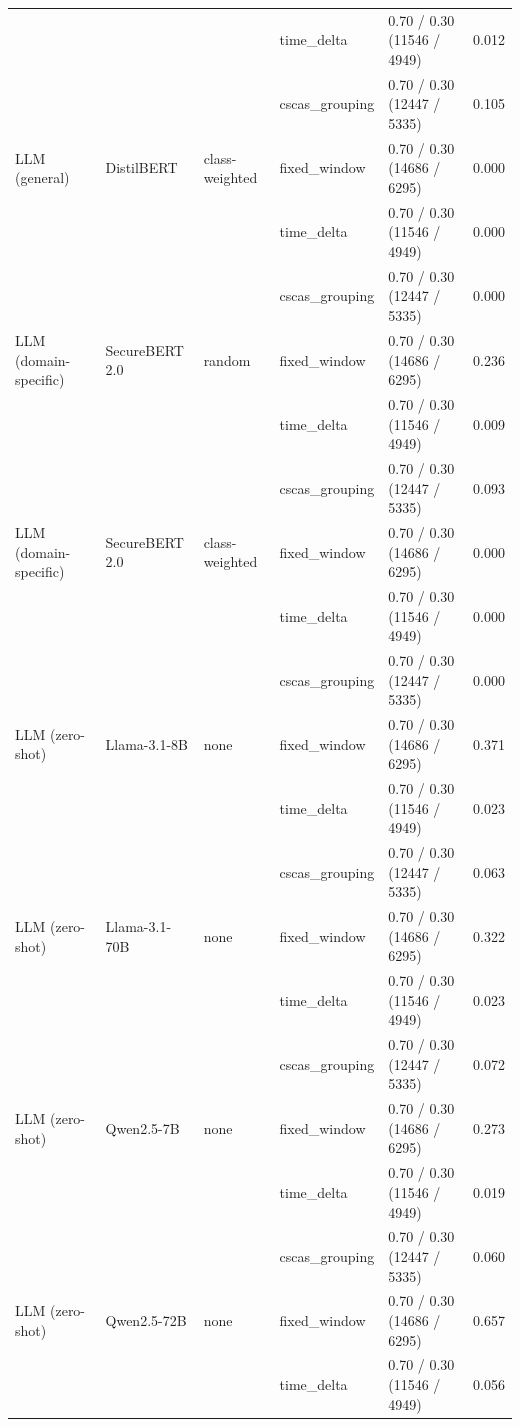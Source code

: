 \begin{table}[htbp]
{\begin{tabular}{lllllc}
 &  &  & time\_delta & 0.70 / 0.30 (11546 / 4949) & 0.012 \\
 &  &  & cscas\_grouping & 0.70 / 0.30 (12447 / 5335) & 0.105 \\
\addlinespace
LLM (general) & DistilBERT & class-weighted & fixed\_window & 0.70 / 0.30 (14686 / 6295) & 0.000 \\
 &  &  & time\_delta & 0.70 / 0.30 (11546 / 4949) & 0.000 \\
 &  &  & cscas\_grouping & 0.70 / 0.30 (12447 / 5335) & 0.000 \\
\addlinespace
LLM (domain-specific) & SecureBERT 2.0 & random & fixed\_window & 0.70 / 0.30 (14686 / 6295) & 0.236 \\
 &  &  & time\_delta & 0.70 / 0.30 (11546 / 4949) & 0.009 \\
 &  &  & cscas\_grouping & 0.70 / 0.30 (12447 / 5335) & 0.093 \\
\addlinespace
LLM (domain-specific) & SecureBERT 2.0 & class-weighted & fixed\_window & 0.70 / 0.30 (14686 / 6295) & 0.000 \\
 &  &  & time\_delta & 0.70 / 0.30 (11546 / 4949) & 0.000 \\
 &  &  & cscas\_grouping & 0.70 / 0.30 (12447 / 5335) & 0.000 \\
\addlinespace
LLM (zero-shot) & Llama-3.1-8B & none & fixed\_window & 0.70 / 0.30 (14686 / 6295) & 0.371 \\
 &  &  & time\_delta & 0.70 / 0.30 (11546 / 4949) & 0.023 \\
 &  &  & cscas\_grouping & 0.70 / 0.30 (12447 / 5335) & 0.063 \\
\addlinespace
LLM (zero-shot) & Llama-3.1-70B & none & fixed\_window & 0.70 / 0.30 (14686 / 6295) & 0.322 \\
 &  &  & time\_delta & 0.70 / 0.30 (11546 / 4949) & 0.023 \\
 &  &  & cscas\_grouping & 0.70 / 0.30 (12447 / 5335) & 0.072 \\
\addlinespace
LLM (zero-shot) & Qwen2.5-7B & none & fixed\_window & 0.70 / 0.30 (14686 / 6295) & 0.273 \\
 &  &  & time\_delta & 0.70 / 0.30 (11546 / 4949) & 0.019 \\
 &  &  & cscas\_grouping & 0.70 / 0.30 (12447 / 5335) & 0.060 \\
\addlinespace
LLM (zero-shot) & Qwen2.5-72B & none & fixed\_window & 0.70 / 0.30 (14686 / 6295) & 0.657 \\
 &  &  & time\_delta & 0.70 / 0.30 (11546 / 4949) & 0.056 \\

\end{tabular}}
\end{table}
